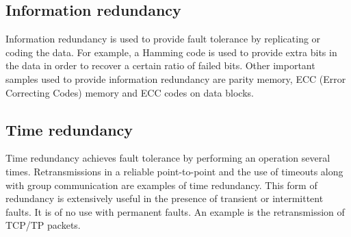 \subsection{Information redundancy}
Information redundancy is used to provide fault tolerance by replicating or coding the data. For example, a Hamming code is used to provide extra bits in the data in order to recover a certain ratio of failed bits. Other important samples used to provide information redundancy are parity memory, ECC (Error Correcting Codes) memory and ECC codes on data blocks.
\subsection{Time redundancy}
Time redundancy achieves fault tolerance by performing an operation several times. Retransmissions in a reliable point-to-point and the use of timeouts along with group communication are examples of time redundancy. This form of redundancy is extensively useful in the presence of transient or intermittent faults. It is of no use with permanent faults. An example is the retransmission of TCP/TP packets. 
